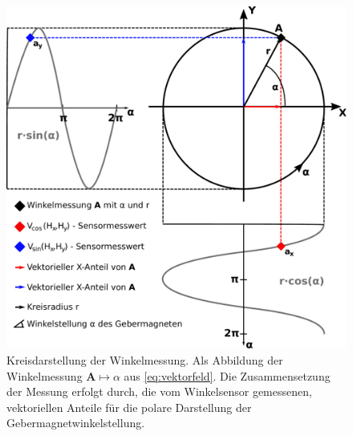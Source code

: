 \clearpage


\begin{figure}[tph]
	\centering
	\includegraphics[width=0.7\linewidth]{chapters/images/2-Grundlagen/Kreisdarstellung_Winkelmessung}
	\caption[Kreisdarstellung der Winkelmessung]{Kreisdarstellung der Winkelmessung. Als Abbildung der
		Winkelmessung $\mathbf{A}\mapsto\alpha$ aus	\autoref{eq:vektorfeld}. Die Zusammensetzung der Messung erfolgt 
		durch, die vom Winkelsensor gemessenen, vektoriellen Anteile für die polare Darstellung der 
		Gebermagnetwinkelstellung.}
	\label{fig:kreisdarstellungwinkelmessung}
\end{figure}


